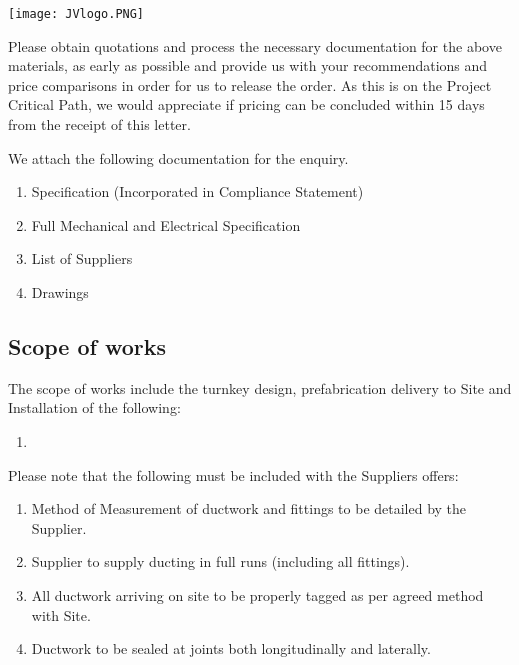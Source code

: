 \documentclass[a4paper,11pt,oneside]{article}
\begin{document}
\sffamily
\mbox{}
\texttt{[image: JVlogo.PNG]}
\vspace{1em}

\Date 


\OurRef

\TOMCD


\setlength{\parskip}{\baselineskip}


Please obtain quotations and process the necessary documentation for the above materials, as early as possible and provide us with your recommendations and price comparisons in order for us to release the order. As this is on the Project Critical Path, we would appreciate if pricing can be concluded within 15 days from the receipt of this letter.

We attach the following documentation for the enquiry. 

\begin{enumerate}

\item Specification (Incorporated in Compliance Statement)
\item Full Mechanical and Electrical Specification
\item List of Suppliers
\item Drawings
\end{enumerate}

\subsection*{Scope of works}

The scope of works include the turnkey design, prefabrication delivery to Site and Installation of the following:

\begin{enumerate}
\item  
\end{enumerate}

Please note that the following must be included with the Suppliers offers:

\begin{enumerate}
\item Method of Measurement of ductwork and fittings to be detailed by the Supplier. 
\item Supplier to supply ducting in full runs (including all fittings). 
\item All ductwork arriving on site to be properly tagged as per agreed method with Site.
\item Ductwork to be sealed at joints both longitudinally and laterally.

\end{enumerate}
\end{document}
